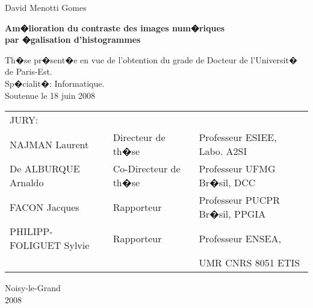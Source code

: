 \clearemptydoublepage

\thispagestyle{empty}

\begin{center}
{\large David Menotti Gomes}
 
\vspace{0.9in}
{\Large \textbf{Am�lioration du contraste des images num�riques}} \\ \vspace{2ex}
{\Large \textbf{par �galisation d'histogrammes}} \\


\vspace{1.5in}
\begin{flushright}
\parbox{4.20in}{
Th�se pr�sent�e en vue de l'obtention du grade de Docteur
de l'Universit� de Paris-Est. \\
Sp�cialit�: Informatique.\\
Soutenue le 18 juin 2008}
\end{flushright}

\vspace{0.5in}
\begin{flushright}
\begin{tabular}{lll}
JURY: & & \\
NAJMAN Laurent          & Directeur de th�se    & Professeur ESIEE, Labo. A2SI \\
De ALBURQUE Arnaldo     & Co-Directeur de th�se & Professeur UFMG Br�sil, DCC \\
FACON Jacques           & Rapporteur            & Professeur PUCPR Br�sil, PPGIA \\
PHILIPP-FOLIGUET Sylvie & Rapporteur            & Professeur ENSEA,\\
                        &                       & UMR CNRS 8051 ETIS\\
\end{tabular}






\end{flushright}

\vspace{.8in}
Noisy-le-Grand\\
2008

\end{center}




